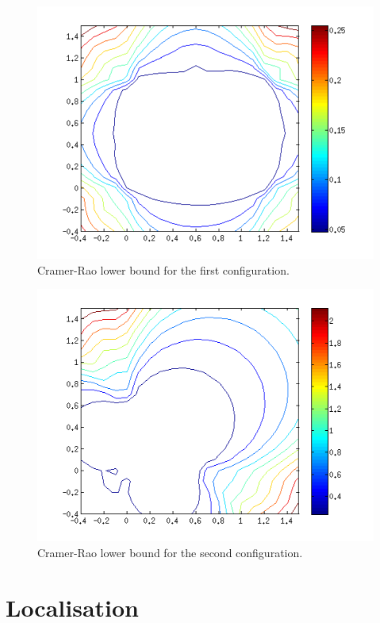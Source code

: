 \documentclass[10pt,a4paper]{report}
\begin{document}
\begin{figure}[H]
\begin{center}
  \includegraphics[width = 350pt]{crlb_good.png}
  \caption{Cramer-Rao lower bound for the first configuration.}
  \label{crlb_good}
  \end{center}
\end{figure}

\begin{figure}[H]
\begin{center}
  \includegraphics[width = 350pt]{crlb_bad.png}
  \caption{Cramer-Rao lower bound for the second configuration.}
  \label{crlb_bad}
  \end{center}
\end{figure}



\newpage
\section{Localisation}
\label{Localisationg}
\end{document}
